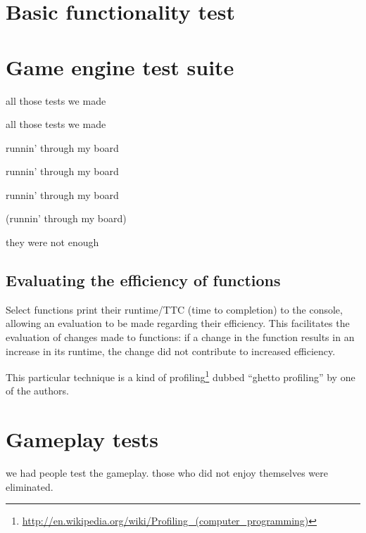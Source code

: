 \section{Basic functionality test}

\section{Game engine test suite}
	all those tests we made

	all those tests we made

	runnin' through my board

	runnin' through my board

	runnin' through my board

	(runnin' through my board)

	they were not enough
	\subsection{Evaluating the efficiency of functions}
		Select functions print their runtime/TTC (time to completion) to the console, allowing an evaluation to be made regarding their efficiency.
		This facilitates the evaluation of changes made to functions: if a change in the function results in an increase in its runtime, the change did not contribute to increased efficiency.

		This particular technique is a kind of profiling\footnote{\url{http://en.wikipedia.org/wiki/Profiling_(computer_programming)}} dubbed ``ghetto profiling'' by one of the authors. 

\section{Gameplay tests}
	we had people test the gameplay.
	those who did not enjoy themselves were eliminated.
